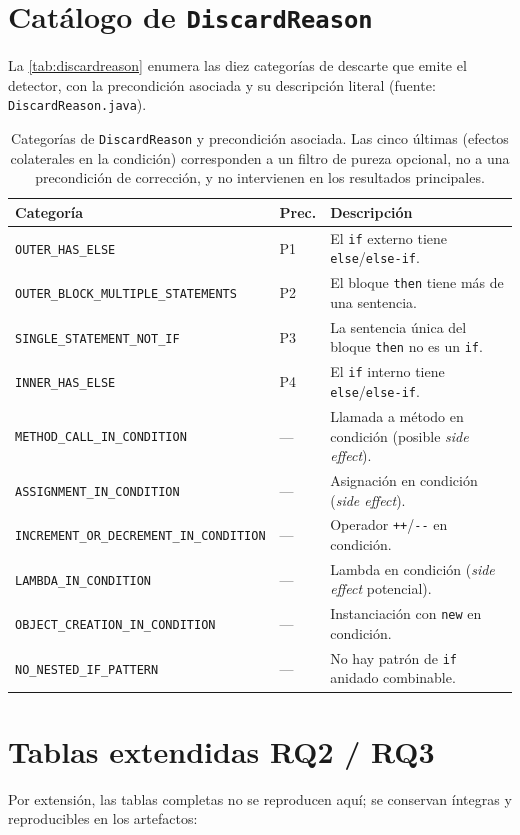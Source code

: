 \chapter{Catálogo de \texttt{DiscardReason}}
\label{ap:discard}
La \autoref{tab:discardreason} enumera las diez categorías de descarte que
emite el detector, con la precondición asociada y su descripción literal
(fuente: \texttt{DiscardReason.java}).

\begin{table}[ht]
\centering
\caption{Categorías de \texttt{DiscardReason} y precondición asociada. Las cinco
últimas (efectos colaterales en la condición) corresponden a un filtro de pureza
opcional, no a una precondición de corrección, y no intervienen en los
resultados principales.}
\label{tab:discardreason}
\begin{tabular}{@{}llp{6.2cm}@{}}
\toprule
\textbf{Categoría} & \textbf{Prec.} & \textbf{Descripción} \\
\midrule
\texttt{OUTER\_HAS\_ELSE} & P1 & El \lstinline|if| externo tiene \lstinline|else|/\lstinline|else-if|. \\
\texttt{OUTER\_BLOCK\_MULTIPLE\_STATEMENTS} & P2 & El bloque \lstinline|then| tiene más de una sentencia. \\
\texttt{SINGLE\_STATEMENT\_NOT\_IF} & P3 & La sentencia única del bloque \lstinline|then| no es un \lstinline|if|. \\
\texttt{INNER\_HAS\_ELSE} & P4 & El \lstinline|if| interno tiene \lstinline|else|/\lstinline|else-if|. \\
\texttt{METHOD\_CALL\_IN\_CONDITION} & --- &Llamada a método en condición (posible \emph{side effect}). \\
\texttt{ASSIGNMENT\_IN\_CONDITION} & --- &Asignación en condición (\emph{side effect}). \\
\texttt{INCREMENT\_OR\_DECREMENT\_IN\_CONDITION} & --- &Operador \lstinline|++|/\lstinline|--| en condición. \\
\texttt{LAMBDA\_IN\_CONDITION} & --- &Lambda en condición (\emph{side effect} potencial). \\
\texttt{OBJECT\_CREATION\_IN\_CONDITION} & --- &Instanciación con \lstinline|new| en condición. \\
\texttt{NO\_NESTED\_IF\_PATTERN} & --- & No hay patrón de \lstinline|if| anidado combinable. \\
\bottomrule
\end{tabular}
\end{table}

\chapter{Tablas extendidas RQ2 / RQ3}
\label{ap:tablas}
Por extensión, las tablas completas no se reproducen aquí; se conservan
íntegras y reproducibles en los artefactos:

